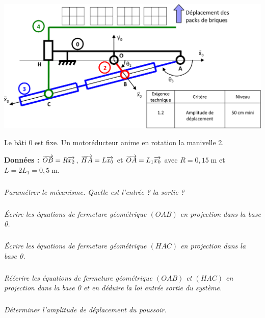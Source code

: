 \documentclass[10pt,fleqn]{article} %
\begin{document}
\begin{multicols}{2}
\begin{center}
\includegraphics[width=.95\linewidth]{images/Fig06_01}
\end{center}

Le bâti 0 est fixe. Un motoréducteur anime en rotation la manivelle 2.


\textbf{Données : } $\overrightarrow{OB}=R\overrightarrow{x_2}$, $\overrightarrow{HA}=L\overrightarrow{x_0}$ et $\overrightarrow{OA}=L_1\overrightarrow{x_0}$ avec $R=0,15 \;\text{m}$ et $L=2L_1=0,5\; \text{m}$.


\subparagraph{}
\textit{Paramétrer le mécanisme. Quelle est l'entrée ? la sortie ?}
\ifprof
\begin{corrige}
\end{corrige}
\else
\fi

\subparagraph{}
\textit{Écrire les équations de fermeture géométrique $(OAB)$ en projection dans la base 0. }
\ifprof
\begin{corrige}
\end{corrige}
\else
\fi

\subparagraph{}
\textit{Écrire les équations de fermeture géométrique $(HAC)$ en projection dans la base 0. }
\ifprof
\begin{corrige}
\end{corrige}
\else
\fi

\subparagraph{}
\textit{Réécrire les équations de fermeture géométrique $(OAB)$ et $(HAC)$ en projection dans la base 0 et en déduire la loi entrée sortie du système. }
\ifprof
\begin{corrige}
\end{corrige}
\else
\fi

\subparagraph{}
\textit{Déterminer l'amplitude de déplacement du poussoir.}
\ifprof
\begin{corrige}
\end{corrige}
\else
\fi



\end{multicols}
\end{document}
